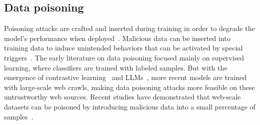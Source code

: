 \subsection{Data poisoning}
Poisoning attacks are crafted and inserted during training in order to degrade the model's performance when deployed~\citep{biggio2012poisoning}. Malicious data can be inserted into training data to induce unintended behaviors that can be activated by special triggers~\citep{gu2017badnets}. The early literature on data poisoning focused mainly on supervised learning, where classifiers are trained with labeled samples. But with the emergence of contrastive learning~\citep{radford2021learning} and LLMs~\citep{brown2020language}, more recent models are trained with large-scale web crawls, making data poisoning attacks more feasible on these untrustworthy web sources. Recent studies have demonstrated that web-scale datasets can be poisoned by introducing malicious data into a small percentage of samples~\citep{carlini2021poisoning, carlini2023poisoning}.

